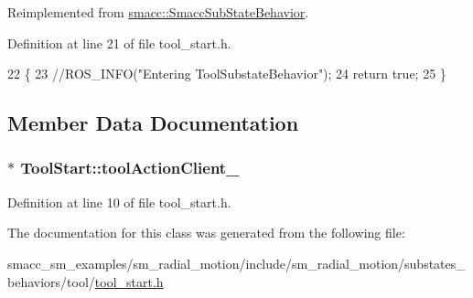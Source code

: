 Reimplemented from \hyperlink{classsmacc_1_1SmaccSubStateBehavior_ab78b9de76c04a7ab6c16d5924e216ef9}{smacc\+::\+Smacc\+Sub\+State\+Behavior}.



Definition at line 21 of file tool\+\_\+start.\+h.


\begin{DoxyCode}
22     \{
23       \textcolor{comment}{//ROS\_INFO("Entering ToolSubstateBehavior");}
24       \textcolor{keywordflow}{return} \textcolor{keyword}{true};
25     \}
\end{DoxyCode}


\subsection{Member Data Documentation}
\subsubsection[{\texorpdfstring{tool\+Action\+Client\+\_\+}{toolActionClient_}}]{$\ast$ Tool\+Start\+::tool\+Action\+Client\+\_\+}\hypertarget{classToolStart_ad9fabf93fd9edf374496393ad6733b27}{}\label{classToolStart_ad9fabf93fd9edf374496393ad6733b27}


Definition at line 10 of file tool\+\_\+start.\+h.



The documentation for this class was generated from the following file\+:\begin{DoxyCompactItemize}
\item 
smacc\+\_\+sm\+\_\+examples/sm\+\_\+radial\+\_\+motion/include/sm\+\_\+radial\+\_\+motion/substates\+\_\+behaviors/tool/\hyperlink{tool__start_8h}{tool\+\_\+start.\+h}\end{DoxyCompactItemize}
